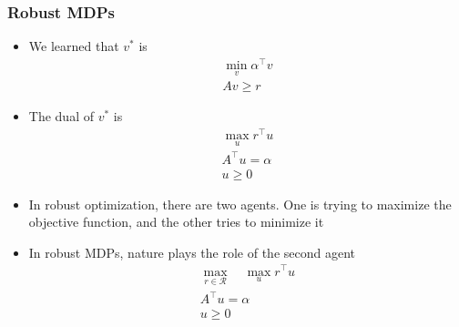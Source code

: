 \documentclass[aspectratio=169]{beamer}
\begin{document}
\begin{frame}
	\frametitle{Robust MDPs}
	\begin{itemize}
		\item We learned that $v^*$ is
		\[
			\begin{matrix}
				\min \limits_v \alpha^\top v \\
				Av \geq r
			\end{matrix}	
		\]
		\item The dual of $v^*$ is
		\[
			\begin{matrix}
				\max \limits_u r^\top u \\
				A^\top u = \alpha \\
				u \geq 0
			\end{matrix}	
		\]
		\item In robust optimization, there are two agents. One is trying to maximize the objective function, and the other tries to minimize it
		\item In robust MDPs, nature plays the role of the second agent
		\[
			\begin{matrix}
				\max \limits_{r \in \mathcal{R}} \quad \max \limits_u r^\top u \\
				A^\top u = \alpha \\
				u \geq 0
			\end{matrix}	
		\]
	\end{itemize}
\end{frame}
\end{document}
